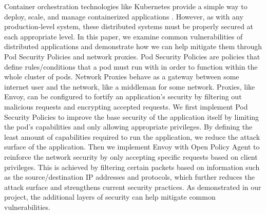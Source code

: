 
Container orchestration technologies like Kubernetes provide a simple way to deploy, scale, 
and manage containerized applications \cite{k8s}. However, as with any production-level 
system, these distributed systems must be properly secured at each appropriate level. In 
this paper, we examine common vulnerabilities of distributed applications and demonstrate 
how we can help mitigate them through Pod Security Policies and network proxies. Pod Security 
Policies are policies that define rules/conditions that a pod must run with in order to 
function within the whole cluster of pods. Network Proxies behave as a gateway between some 
internet user and the network, like a middleman for some network. Proxies, like Envoy, can 
be configured to fortify an application's security by filtering out malicious requests and 
encrypting accepted requests. We first implement Pod Security Policies to improve the base 
security of the application itself by limiting the pod's capabilities and only allowing 
appropriate privileges. By defining the least amount of capabilities required to run the 
application, we reduce the attack surface of the application. Then we implement Envoy with 
Open Policy Agent to reinforce the network security by only accepting specific requests based 
on client privileges. This is achieved by filtering certain packets based on information such 
as the source/destination IP addresses and protocols, which further reduces the attack surface 
and strengthens current security practices. As demonstrated in our project, the additional 
layers of security can help mitigate common vulnerabilities.
